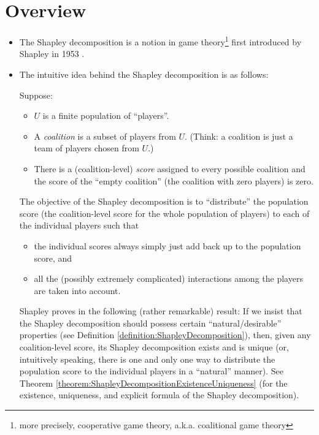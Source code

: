 

\section{Overview}
\setcounter{theorem}{0}
\setcounter{equation}{0}


\renewcommand{\theenumi}{\roman{enumi}}
\renewcommand{\labelenumi}{\textnormal{(\theenumi)}$\;\;$}


\begin{itemize}
\item
	The Shapley decomposition is a notion
	in game theory\footnote{more precisely, cooperative game theory, a.k.a. coalitional game theory}
	first introduced by Shapley in 1953 \cite{Shapley1953}.
\item
	The intuitive idea behind the Shapley decomposition is as follows:

	Suppose:
	\begin{itemize}
	\item
		$U$ is a finite population of ``players''.
	\item
		A \textit{coalition} is a subset of players from $U$.
		(Think: a coalition is just a team of players chosen from $U$.)
	\item
		There is a (coalition-level) \textit{score} assigned to every possible coalition
		and the score of the ``empty coalition'' (the coalition with zero players) is zero.
	\end{itemize}
	
	The objective of the Shapley decomposition is to ``distribute'' the population score
	(the coalition-level score for the whole population of players)
	to each of the individual players such that
	\begin{itemize}
	\item
		the individual scores always simply just {\color{red}add back up} to the population score, and
	\item
		all the (possibly extremely complicated) {\color{red}interactions}
		among the players are taken into account.
	\end{itemize}
	
	Shapley proves in \cite{Shapley1953} the following (rather remarkable) result:
	If we insist that the Shapley decomposition should possess
	certain ``natural/desirable'' properties
	(see Definition \ref{definition:ShapleyDecomposition}),
	then, given any coalition-level score, its Shapley decomposition exists and is unique
	(or, intuitively speaking, there is {\color{red}one and only one} way to distribute
	the population score to the individual players in a ``natural'' manner).
	See Theorem \ref{theorem:ShapleyDecompositionExistenceUniqueness}
	(for the existence, uniqueness, and explicit formula of the Shapley decomposition).


\end{itemize}

